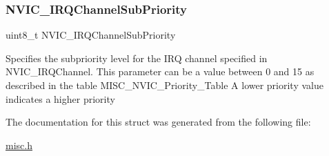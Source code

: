 \subsubsection{\texorpdfstring{N\+V\+I\+C\+\_\+\+I\+R\+Q\+Channel\+Sub\+Priority}{NVIC\_IRQChannelSubPriority}}
{\footnotesize\ttfamily uint8\+\_\+t N\+V\+I\+C\+\_\+\+I\+R\+Q\+Channel\+Sub\+Priority}

Specifies the subpriority level for the I\+RQ channel specified in N\+V\+I\+C\+\_\+\+I\+R\+Q\+Channel. This parameter can be a value between 0 and 15 as described in the table M\+I\+S\+C\+\_\+\+N\+V\+I\+C\+\_\+\+Priority\+\_\+\+Table A lower priority value indicates a higher priority 

The documentation for this struct was generated from the following file\+:\begin{DoxyCompactItemize}
\item 
\mbox{\hyperlink{misc_8h}{misc.\+h}}\end{DoxyCompactItemize}
